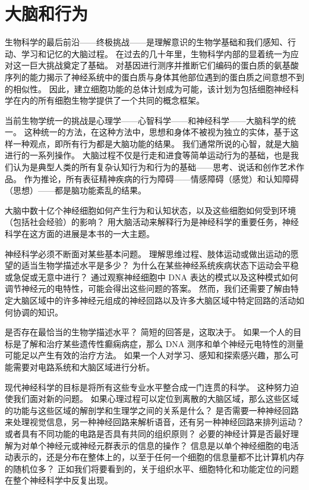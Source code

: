 \chapter{大脑和行为} \label{chap:chap1}
生物科学的最后前沿——终极挑战——是理解意识的生物学基础和我们感知、行动、学习和记忆的大脑过程。 
在过去的几十年里，生物科学内部的显着统一为应对这一巨大挑战奠定了基础。 
对基因进行测序并推断它们编码的蛋白质的氨基酸序列的能力揭示了神经系统中的蛋白质与身体其他部位遇到的蛋白质之间意想不到的相似性。 
因此，建立细胞功能的总体计划成为可能，该计划为包括细胞神经科学在内的所有细胞生物学提供了一个共同的概念框架。


当前生物学统一的挑战是心理学——心智科学——和神经科学——大脑科学的统一。 
这种统一的方法，在这种方法中，思想和身体不被视为独立的实体，基于这样一种观点，即所有行为都是大脑功能的结果。 
我们通常所说的心智，就是大脑进行的一系列操作。 
大脑过程不仅是行走和进食等简单运动行为的基础，也是我们认为是典型人类的所有复杂认知行为和行为的基础——思考、说话和创作艺术作品。 
作为推论，所有表征精神疾病的行为障碍——情感障碍（感觉）和认知障碍（思想）——都是脑功能紊乱的结果。


大脑中数十亿个神经细胞如何产生行为和认知状态，以及这些细胞如何受到环境（包括社会经验）的影响？ 
用大脑活动来解释行为是神经科学的重要任务，神经科学在这方面的进展是本书的一大主题。


神经科学必须不断面对某些基本问题。 
理解思维过程、肢体运动或做出运动的愿望的适当生物学描述水平是多少？ 
为什么在某些神经系统疾病状态下运动会平稳或急促或无意中进行？ 
通过观察神经细胞中 DNA 表达的模式以及这种模式如何调节神经元的电特性，可能会得出这些问题的答案。 
然而，我们还需要了解由特定大脑区域中的许多神经元组成的神经回路以及许多大脑区域中特定回路的活动如何协调的知识。


是否存在最恰当的生物学描述水平？ 
简短的回答是，这取决于。 
如果一个人的目标是了解和治疗某些遗传性癫痫病症，那么 DNA 测序和单个神经元电特性的测量可能足以产生有效的治疗方法。 
如果一个人对学习、感知和探索感兴趣，那么可能需要对电路系统和大脑区域进行分析。


现代神经科学的目标是将所有这些专业水平整合成一门连贯的科学。 
这种努力迫使我们面对新的问题。 如果心理过程可以定位到离散的大脑区域，那么这些区域的功能与这些区域的解剖学和生理学之间的关系是什么？ 
是否需要一种神经回路来处理视觉信息，另一种神经回路来解析语音，还有另一种神经回路来排列运动？ 
或者具有不同功能的电路是否具有共同的组织原则？ 
必要的神经计算是否最好理解为对单个神经元或神经元群表示的信息的操作？ 
信息是以单个神经细胞的电活动表示的，还是分布在整体上的，以至于任何一个细胞的信息量都不比计算机内存的随机位多？ 
正如我们将要看到的，关于组织水平、细胞特化和功能定位的问题在整个神经科学中反复出现。


